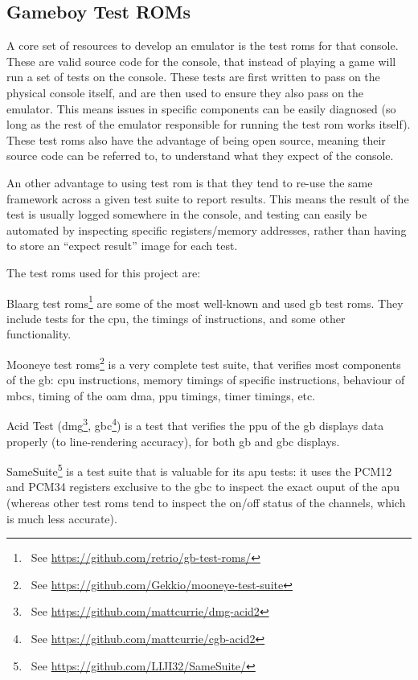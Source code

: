 \documentclass[11pt]{report}
\newcommand{\ftnt}[1]{\footnote{~See \url{#1}}}
\begin{document}
\subsection{Gameboy Test ROMs}
\label{sec:gb-test-roms}

A core set of resources to develop an emulator is the test \glspl{rom} for that console. These are valid source code for the console, that instead of playing a game will run a set of tests on the console. These tests are first written to pass on the physical console itself, and are then used to ensure they also pass on the emulator. This means issues in specific components can be easily diagnosed (so long as the rest of the emulator responsible for running the test \gls{rom} works itself). These test \glspl{rom} also have the advantage of being open source, meaning their source code can be referred to, to understand what they expect of the console.

An other advantage to using test \gls{rom} is that they tend to re-use the same framework across a given test suite to report results. This means the result of the test is usually logged somewhere in the console, and testing can easily be automated by inspecting specific registers/memory addresses, rather than having to store an ``expect result'' image for each test.

The test \glspl{rom} used for this project are:

\begin{compactitem}
    \item Blaarg test \glspl{rom}\ftnt{https://github.com/retrio/gb-test-roms/} are some of the most well-known and used \gls{gb} test \glspl{rom}. They include tests for the \gls{cpu}, the timings of instructions, and some other functionality.
    \item Mooneye test \glspl{rom}\ftnt{https://github.com/Gekkio/mooneye-test-suite} is a very complete test suite, that verifies most components of the \gls{gb}: \gls{cpu} instructions, memory timings of specific instructions, behaviour of \glspl{mbc}, timing of the \gls{oam} \gls{dma}, \gls{ppu} timings, timer timings, etc.
    \item Acid Test (\gls{dmg}\ftnt{https://github.com/mattcurrie/dmg-acid2}, \gls{gbc}\ftnt{https://github.com/mattcurrie/cgb-acid2}) is a test that verifies the \gls{ppu} of the \gls{gb} displays data properly (to line-rendering accuracy), for both \glsdesc{gb} and \glsdesc{gbc} displays.
    \item SameSuite\ftnt{https://github.com/LIJI32/SameSuite/} is a test suite that is valuable for its \gls{apu} tests: it uses the PCM12 and PCM34 registers exclusive to the \gls{gbc} to inspect the exact ouput of the \gls{apu} (whereas other test \glspl{rom} tend to inspect the on/off status of the channels, which is much less accurate).
\end{compactitem}
\end{document}
